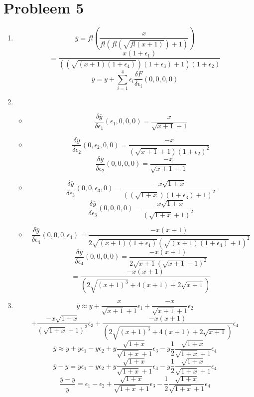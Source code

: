 \documentclass[12pt,a4paper]{article}
\begin{document}
\section{Probleem 5}
\begin{enumerate}
\item
\[
\overline{y} =
fl\left(
\frac{x}{fl\left(fl\left(\sqrt{fl\left(x+1\right)}\right)+1\right)}
\right)
\]
\[
=
\frac{x(1+\epsilon_1)}{\left(\left(\sqrt{\left(x+1\right)(1+\epsilon_4)}\right)(1+\epsilon_3)+1\right)(1+\epsilon_2)}
\]
\[
\overline{y} = y + \sum_{i=1}^4\epsilon_i\frac{\delta F}{\delta\epsilon_i}(0,0,0,0)
\]
\item
\begin{itemize}
\item
\[
\frac{\delta \overline{y}}{\delta \epsilon_1}(\epsilon_1,0,0,0)
= \frac{x}{\sqrt{x+1}+1}
\]
\item
\[
\frac{\delta \overline{y}}{\delta \epsilon_2}(0,\epsilon_2,0,0)
= \frac{-x}{\left(\sqrt{x+1}+1\right)(1+\epsilon_2)^2}
\]
\[
\frac{\delta \overline{y}}{\delta \epsilon_2}(0,0,0,0)
= \frac{-x}{\sqrt{x+1}+1}
\]
\item
\[
\frac{\delta \overline{y}}{\delta \epsilon_3}(0,0,\epsilon_3,0)
= \frac{-x\sqrt{1+x}}{\left((\sqrt{1+x})(1+\epsilon_3)+1\right)^2}
\]
\[
\frac{\delta \overline{y}}{\delta \epsilon_3}(0,0,0,0)
= \frac{-x\sqrt{1+x}}{\left(\sqrt{1+x}+1\right)^2}
\]
\item
\[
\frac{\delta \overline{y}}{\delta \epsilon_4}(0,0,0,\epsilon_4)
= \frac{-x(x+1)}{2\sqrt{(x+1)(1+\epsilon_4)}\left(\sqrt{(x+1)(1+\epsilon_4)}+1\right)^2}
\]
\[
\frac{\delta \overline{y}}{\delta \epsilon_4}(0,0,0,0)
= \frac{-x(x+1)}{2\sqrt{x+1}\left(\sqrt{x+1}+1\right)^2}
\]
\[
= \frac{-x(x+1)}{(2\sqrt{(x+1)^3}+ 4(x+1)+2\sqrt{x+1})}
\]
\end{itemize}
\item
\[
\overline{y} \approx y +
\frac{x}{\sqrt{x+1}+1} \epsilon_1
+
\frac{-x}{\sqrt{x+1}+1} \epsilon_2
\]\[
+
\frac{-x\sqrt{1+x}}{\left(\sqrt{1+x}+1\right)^2} \epsilon_3
+
\frac{-x(x+1)}{(2\sqrt{(x+1)^3}+ 4(x+1)+2\sqrt{x+1})} \epsilon_4
\]
\[
\overline{y}
\approx
y+
y \epsilon_1
-
y \epsilon_2
+
y \frac{\sqrt{1+x}}{\sqrt{1+x}+1} \epsilon_3
-
y \frac{1}{2}\frac{\sqrt{1+x}}{\sqrt{1+x}+1} \epsilon_4
\]
\[
\overline{y}-y
= 
y \epsilon_1
-
y \epsilon_2
+
y \frac{\sqrt{1+x}}{\sqrt{1+x}+1} \epsilon_3
-
y \frac{1}{2}\frac{\sqrt{1+x}}{\sqrt{1+x}+1} \epsilon_4
\]
\[
\frac{\overline{y} - y}{y}
=
\epsilon_1
-
\epsilon_2
+
\frac{\sqrt{1+x}}{\sqrt{1+x}+1} \epsilon_3
-
\frac{1}{2}\frac{\sqrt{1+x}}{\sqrt{1+x}+1} \epsilon_4
\]
\end{enumerate}
\end{document}
